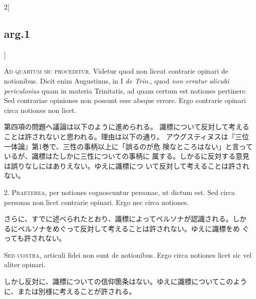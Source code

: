 \documentclass[paper=a4paper,fontsize=10pt,jafontsize=9pt,titlepage]{jlreq}
\begin{document}
\begin{paracol}{2}[\subsection{arg.1}]

{\scshape Ad quartum sic proceditur}. Videtur quod non liceat contrarie opinari
de notionibus. Dicit enim Augustinus, in I {\itshape de Trin}., quod {\itshape non erratur
alicubi periculosius} quam in materia Trinitatis, ad quam certum est
notiones pertinere. Sed contrariae opiniones non possunt esse absque
errore. Ergo contrarie opinari circa notiones non licet.

\switchcolumn

第四項の問題へ議論は以下のように進められる。
識標について反対して考えることは許されないと思われる。理由は以下の通り。
アウグスティヌスは『三位一体論』第1巻で、三性の事柄以上に「誤るのが危
 険なところはない」と言っているが、識標はたしかに三性についての事柄に
 属する。しかるに反対する意見は誤りなしにはありえない。ゆえに識標につ
 いて反対して考えることは許されない。


2. {\scshape Praeterea}, per notiones cognoscuntur personae, ut dictum est. Sed
circa personas non licet contrarie opinari. Ergo nec circa notiones.

\switchcolumn

さらに、すでに述べられたとおり、識標によってペルソナが認識される。しか
 るにペルソナをめぐって反対して考えることは許されない。ゆえに識標をめ
 ぐっても許されない。

\switchcolumn*[\subsection{s.c.}]

{\scshape Sed contra}, articuli fidei non sunt de notionibus. Ergo circa notiones
licet sic vel aliter opinari.

\switchcolumn

しかし反対に、識標についての信仰箇条はない。ゆえに識標についてこのよう
 に、または別様に考えることが許される。



\end{paracol}
\end{document}
